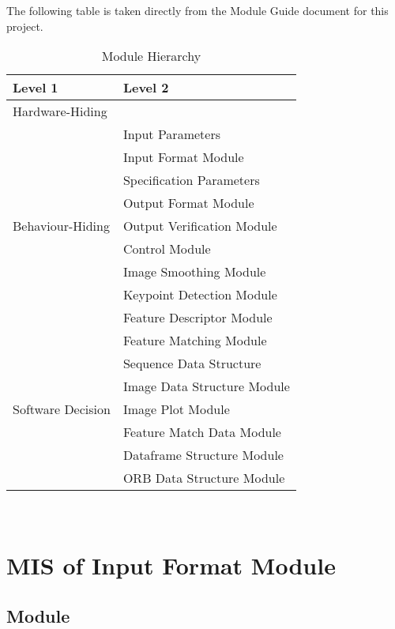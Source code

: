 \documentclass[12pt, titlepage]{article}
\begin{document}
The following table is taken directly from the Module Guide document for this project.

\begin{table}[h!]
\centering
\begin{tabular}{p{} p{}}
\toprule
\textbf{Level 1} & \textbf{Level 2}\\
\midrule

{Hardware-Hiding} & ~ \\
\midrule

\multirow{9}{0.3\textwidth}{Behaviour-Hiding} & Input Parameters\\
& Input Format Module \\
& Specification Parameters \\
& Output Format Module \\
& Output Verification Module \\
& Control Module \\
& Image Smoothing Module \\
& Keypoint Detection Module \\
& Feature Descriptor Module \\
& Feature Matching Module \\
\midrule

\multirow{5}{0.3\textwidth}{Software Decision} & {Sequence Data Structure}\\
& Image Data Structure Module \\
& Image Plot Module \\
& Feature Match Data Module \\
& Dataframe Structure Module \\
& ORB Data Structure Module \\
\bottomrule
 
\end{tabular}
\caption{Module Hierarchy}
\label{TblMH}
\end{table}

\newpage
~\newpage


\section{MIS of Input Format Module} \label{mIF}



\subsection{Module}
\end{document}
